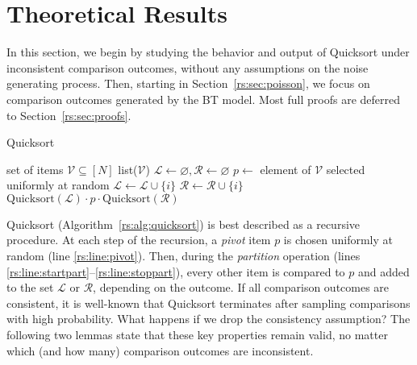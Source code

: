 \section{Theoretical Results}  %
\label{rs:sec:theory}

In this section, we begin by studying the behavior and output of Quicksort under inconsistent comparison outcomes, without any assumptions on the noise generating process.
Then, starting in Section~\ref{rs:sec:poisson}, we focus on comparison outcomes generated by the BT model.
Most full proofs are deferred to Section~\ref{rs:sec:proofs}.

\begin{algorithm}[t]
   \caption{Quicksort}
   \label{rs:alg:quicksort}
\begin{algorithmic}[1]
   \Require set of items $\mathcal{V} \subseteq [N]$
    \Return list($\mathcal{V}$)
   \State $\mathcal{L} \gets \varnothing, \mathcal{R} \gets \varnothing$
   \State $p \gets $ element of $\mathcal{V}$ selected uniformly at random \label{rs:line:pivot}
    \label{rs:line:startpart}
      \label{rs:line:comp}
       \State $\mathcal{L} \gets \mathcal{L} \cup \{i\}$
     \Else
       \State $\mathcal{R} \gets \mathcal{R} \cup \{i\}$
     \EndIf
   \EndFor  \label{rs:line:stoppart}
   \State \Return $\text{Quicksort}(\mathcal{L}) \cdot p \cdot \text{Quicksort}(\mathcal{R})$ \label{rs:line:return}
\end{algorithmic}
\end{algorithm}

Quicksort (Algorithm~\ref{rs:alg:quicksort}) is best described as a recursive procedure.
At each step of the recursion, a \emph{pivot} item $p$ is chosen uniformly at random (line \ref{rs:line:pivot}).
Then, during the \emph{partition} operation (lines \ref{rs:line:startpart}--\ref{rs:line:stoppart}), every other item is compared to $p$ and added to the set $\mathcal{L}$ or $\mathcal{R}$, depending on the outcome.
If all comparison outcomes are consistent, it is well-known that Quicksort terminates after sampling  comparisons with high probability.
What happens if we drop the consistency assumption?
The following two lemmas state that these key properties remain valid, no matter which (and how many) comparison outcomes are inconsistent.

